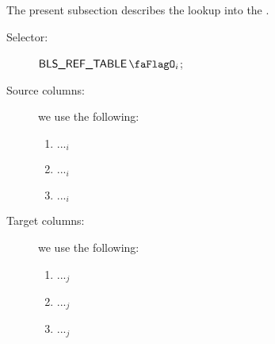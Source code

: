 The present subsection describes the lookup into the \blsRefTable{}.
\begin{description}
	\item[Selector:] $\blsRefTableFlag{}_{i}$;
	\item[Source columns:] we use the following:
		\begin{multicols}{2}
			\begin{enumerate}
				\item $..._{i}$
				\item $..._{i}$
				\item $..._{i}$
			\end{enumerate}
		\end{multicols}
	\item[Target columns:] we use the following:
		\begin{multicols}{2}
			\begin{enumerate}
				\item $..._{j}$
				\item $..._{j}$
				\item $..._{j}$
			\end{enumerate}
		\end{multicols}
\end{description}
